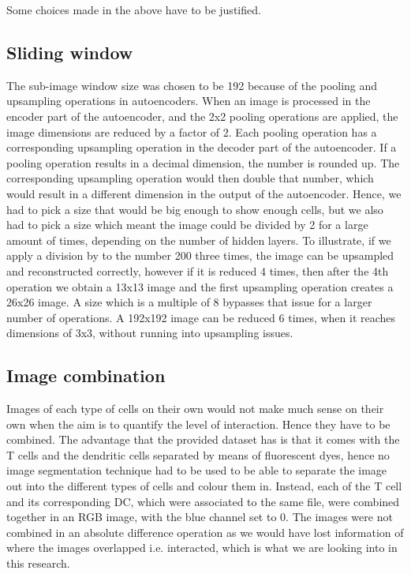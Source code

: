 Some choices made in the above have to be justified. 

\subsection{Sliding window}

The sub-image window size was chosen to be 192 because of the pooling and upsampling operations in autoencoders. When an image is processed in the encoder part of the autoencoder, and the 2x2 pooling operations are applied, the image dimensions are reduced by a factor of 2. Each pooling operation has a corresponding upsampling operation in the decoder part of the autoencoder. If a pooling operation results in a decimal dimension, the number is rounded up. The corresponding upsampling operation would then double that number, which would result in a different dimension in the output of the autoencoder. Hence, we had to pick a size that would be big enough to show enough cells, but we also had to pick a size which meant the image could be divided by 2 for a large amount of times, depending on the number of hidden layers. To illustrate, if we apply a division by to the number 200 three times, the image can be upsampled and reconstructed correctly, however if it is reduced 4 times, then after the 4th operation we obtain a 13x13 image and the first upsampling operation creates a 26x26 image. A size which is a multiple of 8 bypasses that issue for a larger number of operations. A 192x192 image can be reduced 6 times, when it reaches dimensions of 3x3, without running into upsampling issues.

\subsection{Image combination}

Images of each type of cells on their own would not make much sense on their own when the aim is to quantify the level of interaction. Hence they have to be combined. The advantage that the provided dataset has is that it comes with the T cells and the dendritic cells separated by means of fluorescent dyes, hence no image segmentation technique had to be used to be able to separate the image out into the different types of cells and colour them in. Instead, each of the T cell and its corresponding DC, which were associated to the same file, were combined together in an RGB image, with the blue channel set to 0. The images were not combined in an absolute difference operation as we would have lost information of where the images overlapped i.e. interacted, which is what we are looking into in this research.

